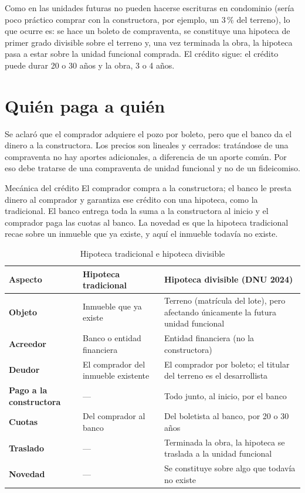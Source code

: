 \documentclass[12pt,oneside]{book}
\begin{document}
Como en las unidades futuras no pueden hacerse escrituras en condominio (sería poco práctico comprar con la constructora, por ejemplo, un 3\,\% del terreno), lo que ocurre es: se hace un boleto de compraventa, se constituye una hipoteca de primer grado divisible sobre el terreno y, una vez terminada la obra, la hipoteca pasa a estar sobre la unidad funcional comprada. El crédito sigue: el crédito puede durar 20 o 30 años y la obra, 3 o 4 años.

\section{Quién paga a quién}

Se aclaró que el comprador adquiere el pozo por boleto, pero que el banco da el dinero a la constructora. Los precios son lineales y cerrados: tratándose de una compraventa no hay aportes adicionales, a diferencia de un aporte común. Por eso debe tratarse de una compraventa de unidad funcional y no de un fideicomiso.

\begin{example}{Mecánica del crédito}
El comprador compra a la constructora; el banco le presta dinero al comprador y garantiza ese crédito con una hipoteca, como la tradicional. El banco entrega toda la suma a la constructora al inicio y el comprador paga las cuotas al banco. La novedad es que la hipoteca tradicional recae sobre un inmueble que ya existe, y aquí el inmueble todavía no existe.
\end{example}

\begin{table}[H]
\centering
\small
\begin{tabularx}{\textwidth}{>{\raggedright\arraybackslash}p{2.6cm}YY}
\toprule
\textbf{Aspecto} & \textbf{Hipoteca tradicional} & \textbf{Hipoteca divisible (DNU 2024)} \\
\midrule
\textbf{Objeto} & Inmueble que ya existe & Terreno (matrícula del lote), pero afectando únicamente la futura unidad funcional \\
\addlinespace
\textbf{Acreedor} & Banco o entidad financiera & Entidad financiera (no la constructora) \\
\addlinespace
\textbf{Deudor} & El comprador del inmueble existente & El comprador por boleto; el titular del terreno es el desarrollista \\
\addlinespace
\textbf{Pago a la constructora} & --- & Todo junto, al inicio, por el banco \\
\addlinespace
\textbf{Cuotas} & Del comprador al banco & Del boletista al banco, por 20 o 30 años \\
\addlinespace
\textbf{Traslado} & --- & Terminada la obra, la hipoteca se traslada a la unidad funcional \\
\addlinespace
\textbf{Novedad} & --- & Se constituye sobre algo que todavía no existe \\
\bottomrule
\end{tabularx}
\caption{Hipoteca tradicional e hipoteca divisible}
\end{table}
\end{document}
